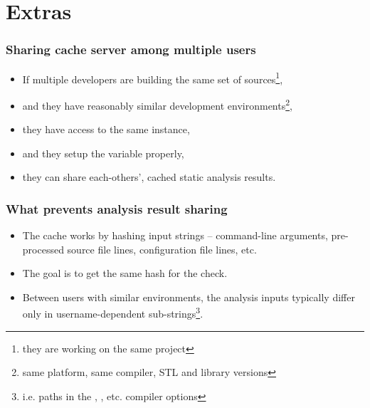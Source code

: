 \documentclass[compress,table,xcolor=table]{beamer}
\begin{document}
\section{Extras}
\begin{frame}
  \Huge
\end{frame}
\begin{frame}
  \frametitle{Sharing cache server among multiple users}
  \Large
  \begin{itemize}
  \item If multiple developers are building the same set of sources\footnote{
      they are working on the same project},
  \item and they have reasonably similar development environments\footnote{
      same platform, same compiler, STL and library versions},
  \item they have access to the same  instance,
  \item and they setup the  variable properly,
  \item they can share each-others', cached static analysis results.
  \end{itemize}
\end{frame}
\begin{frame}
  \frametitle{What prevents analysis result sharing}
  \Large
  \begin{itemize}
  \item The cache works by hashing input strings -- command-line arguments,
      pre-processed source file lines, configuration file lines, etc.
  \item The goal is to get the {\larger same hash} for the {\larger {} check}.
  \item Between users with similar environments, the analysis inputs typically
      differ only in {\larger username-dependent} sub-strings\footnote{
      i.e. paths in the , , etc. compiler options}.
  \end{itemize}
\end{frame}
\end{document}
